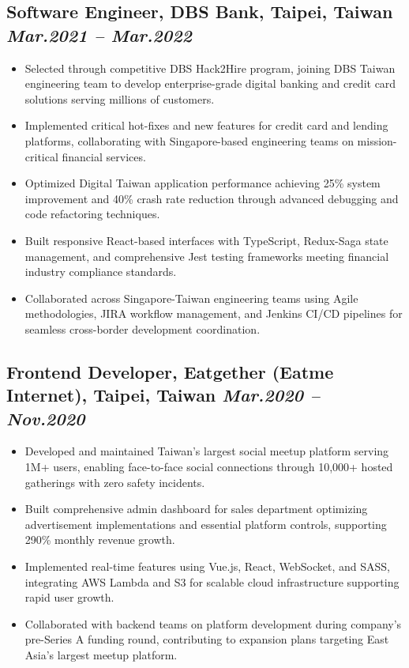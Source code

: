 \documentclass[11pt,a4paper]{article}
\newcommand{\resumeItem}[1]{\item\small{#1}}
\begin{document}
\subsection{Software Engineer, DBS Bank, Taipei, Taiwan \hfill \textit{Mar.2021 -- Mar.2022}}
\begin{itemize}[leftmargin=*, itemsep=1pt, parsep=0pt]
    \resumeItem{Selected through competitive DBS Hack2Hire program, joining DBS Taiwan engineering team to develop enterprise-grade digital banking and credit card solutions serving millions of customers.}
    \resumeItem{Implemented critical hot-fixes and new features for credit card and lending platforms, collaborating with Singapore-based engineering teams on mission-critical financial services.}
    \resumeItem{Optimized Digital Taiwan application performance achieving 25\% system improvement and 40\% crash rate reduction through advanced debugging and code refactoring techniques.}
    \resumeItem{Built responsive React-based interfaces with TypeScript, Redux-Saga state management, and comprehensive Jest testing frameworks meeting financial industry compliance standards.}
    \resumeItem{Collaborated across Singapore-Taiwan engineering teams using Agile methodologies, JIRA workflow management, and Jenkins CI/CD pipelines for seamless cross-border development coordination.}
\end{itemize}

\subsection{Frontend Developer, Eatgether (Eatme Internet), Taipei, Taiwan \hfill \textit{Mar.2020 -- Nov.2020}}
\begin{itemize}[leftmargin=*, itemsep=1pt, parsep=0pt]
    \resumeItem{Developed and maintained Taiwan's largest social meetup platform serving 1M+ users, enabling face-to-face social connections through 10,000+ hosted gatherings with zero safety incidents.}
    \resumeItem{Built comprehensive admin dashboard for sales department optimizing advertisement implementations and essential platform controls, supporting 290\% monthly revenue growth.}
    \resumeItem{Implemented real-time features using Vue.js, React, WebSocket, and SASS, integrating AWS Lambda and S3 for scalable cloud infrastructure supporting rapid user growth.}
    \resumeItem{Collaborated with backend teams on platform development during company's pre-Series A funding round, contributing to expansion plans targeting East Asia's largest meetup platform.}
\end{itemize}
\end{document}

